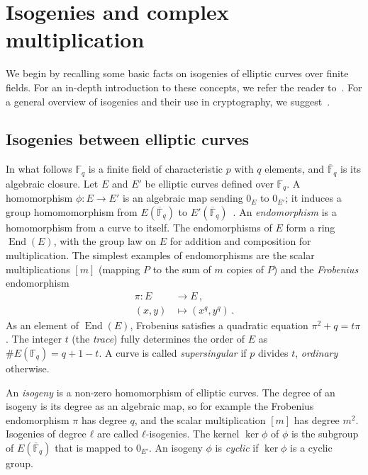\documentclass{llncs}
\newcommand{\F}{\mathbb{F}}
\newcommand{\Fbar}{\overline{\mathbb{F}}}
\DeclareMathOperator{\End}{End}
\begin{document}
\section{Isogenies and complex multiplication}
\label{sec:math}

We begin by recalling some basic facts on isogenies of elliptic curves 
over finite fields. For an in-depth introduction to these concepts, we
refer the reader to~\cite{silverman:elliptic}. For a general
overview of isogenies and their use in cryptography, we
suggest~\cite{defeo2017isogenybased}.

\subsection{Isogenies between elliptic curves}
\label{sec:isogeny}

In what follows $\F_q$ is a finite field of characteristic $p$ with
$q$ elements, and $\Fbar_q$ is its algebraic closure. Let $E$ and $E'$
be elliptic curves defined over $\F_q$. 
A homomorphism $ϕ:E→E'$ is an
algebraic map sending $0_E$ to $0_{E'}$;
it induces a group homomomorphism from
$E(\Fbar_q)$ to $E'(\Fbar_q)$~\cite[III.4]{silverman:elliptic}.
An \emph{endomorphism} is a homomorphism from a curve to itself.
The endomorphisms of $E$ form a ring $\End(E)$,
with the group law on $E$ for addition
and composition for multiplication.
The simplest examples of endomorphisms
are the scalar multiplications $[m]$
(mapping $P$ to the sum of $m$ copies of $P$)
and the \emph{Frobenius} endomorphism
\begin{align*}
  π : E &\longrightarrow E \,, \\
  (x,y) &\longmapsto (x^q,y^q) \,.
\end{align*}
As an element of $\End(E)$, Frobenius satisfies a quadratic equation
$π^2 + q = tπ$.  The integer $t$ (the \emph{trace})
fully determines the order of $E$ as $\#E(\F_q)=q+1-t$. A curve is
called \emph{supersingular} if $p$ divides $t$, \emph{ordinary}
otherwise.

An \emph{isogeny} is a non-zero homomorphism of elliptic curves.
The
degree of an isogeny is its degree as an algebraic map,
so for example the Frobenius endomorphism $\pi$ has degree $q$,
and the scalar multiplication $[m]$ has degree $m^2$.
Isogenies of degree $ℓ$ are called $ℓ$-isogenies.
The kernel $\ker ϕ$ of $\phi$
is the subgroup of $E(\Fbar_q)$ that is
mapped to $0_{E'}$. 
An isogeny $ϕ$ is \emph{cyclic} 
if $\ker ϕ$ is a cyclic group.
\end{document}
